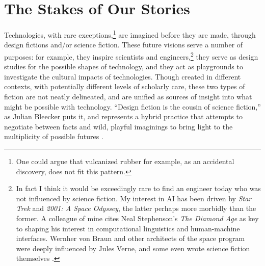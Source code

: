 \chapter{The Stakes of Our Stories}
\label{chap:2}












Technologies, with rare exceptions,\footnote{One could argue that
  vulcanized rubber for example, as an accidental discovery, does not
  fit this pattern.} are imagined before they are made, through design
fictions and/or science fiction. These future
visions serve a number of purposes: for example, they inspire scientists and
engineers,\footnote{In fact I think it would be exceedingly rare to
  find an engineer today who was not influenced by science fiction. My
  interest in AI has been driven by \emph{Star Trek} and \emph{2001: A
  Space Odyssey}, the latter perhaps more morbidly than the former. A
  colleague of mine cites Neal Stephenson's
  \emph{The Diamond Age} as key to shaping his interest in
  computational linguistics and human-machine interfaces. Wernher von
  Braun and other architects of the space program were deeply
  influenced by Jules Verne, and some even wrote science fiction
  themselves \cite[p. 2]{marketingMoon}.} they serve as design
studies for the possible shapes of technology, and they act as
playgrounds to investigate the cultural impacts of technologies.
Though created in different contexts, with potentially 
different levels of scholarly care, these two types of fiction are not
neatly delineated, and are unified as sources of insight into what
might be possible with technology. ``Design fiction is the cousin of
science fiction,'' as Julian Bleecker puts it, and represents a hybrid
practice that attempts to negotiate between facts and wild, playful
imaginings to bring light to the multiplicity of possible
futures \cite[p. 8]{bleecker}. 

